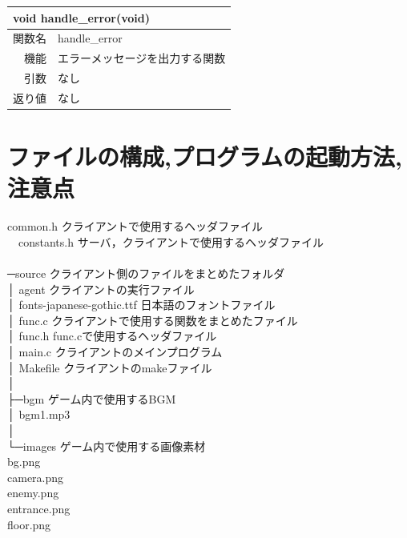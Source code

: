 \documentclass{jarticle}
\begin{document}
\begin{table}[H]
\begin{tabular}{|r|l|}
\hline
\multicolumn{2}{|l|}{void handle\_error(void)}       \\ \hline
関数名           & handle\_error \\ \hline
機能     & エラーメッセージを出力する関数 \\
引数     & なし \\
返り値   & なし \\ \hline
\end{tabular}
\end{table}


\section{ファイルの構成,プログラムの起動方法,注意点}
common.h クライアントで使用するヘッダファイル \\
　constants.h サーバ，クライアントで使用するヘッダファイル \\
 \\
─source クライアント側のファイルをまとめたフォルダ \\
  │  agent クライアントの実行ファイル \\
  │  fonts-japanese-gothic.ttf 日本語のフォントファイル \\
  │  func.c クライアントで使用する関数をまとめたファイル \\
  │  func.h func.cで使用するヘッダファイル \\
  │  main.c クライアントのメインプログラム \\
  │  Makefile クライアントのmakeファイル \\
  │ \\
  ├─bgm ゲーム内で使用するBGM \\
  │      bgm1.mp3 \\
  │ \\
  └─images ゲーム内で使用する画像素材 \\
\hspace{3em}    bg.png \\
\hspace{3em}    camera.png \\
\hspace{3em}    enemy.png \\
\hspace{3em}    entrance.png \\
\hspace{3em}    floor.png \\
\end{document}

